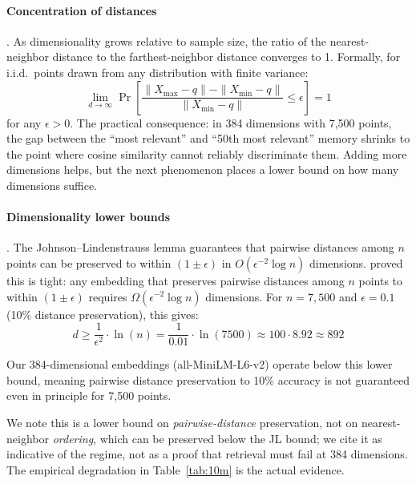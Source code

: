 \documentclass[11pt]{article}
\begin{document}
\paragraph{Concentration of distances} \citep{Beyer1999}.
As dimensionality grows relative to sample size, the ratio of the
nearest-neighbor distance to the farthest-neighbor distance converges
to 1.  Formally, for i.i.d.\ points drawn from any distribution with
finite variance:
\begin{equation}
\lim_{d \to \infty} \Pr\!\left[\frac{\|X_{\max} - q\| - \|X_{\min} - q\|}{\|X_{\min} - q\|} \leq \epsilon\right] = 1
\label{eq:concentration}
\end{equation}
for any $\epsilon > 0$.  The practical consequence: in 384 dimensions
with 7,500 points, the gap between the ``most relevant'' and ``50th
most relevant'' memory shrinks to the point where cosine similarity
cannot reliably discriminate them.  Adding more dimensions helps, but
the next phenomenon places a lower bound on how many dimensions suffice.

\paragraph{Dimensionality lower bounds} \citep{Larsen2017}.
The Johnson--Lindenstrauss lemma guarantees that pairwise distances
among $n$ points can be preserved to within $(1 \pm \epsilon)$ in
$O(\epsilon^{-2} \log n)$ dimensions.  \citet{Larsen2017} proved
this is tight: any embedding that preserves pairwise distances among
$n$ points to within $(1 \pm \epsilon)$ requires
$\Omega(\epsilon^{-2} \log n)$ dimensions.  For $n = 7{,}500$ and
$\epsilon = 0.1$ (10\% distance preservation), this gives:
\begin{equation}
d \geq \frac{1}{\epsilon^2} \cdot \ln(n) = \frac{1}{0.01} \cdot \ln(7500) \approx 100 \cdot 8.92 \approx 892
\label{eq:jl-bound}
\end{equation}

Our 384-dimensional embeddings (all-MiniLM-L6-v2) operate below
this lower bound, meaning pairwise distance preservation to 10\%
accuracy is not guaranteed even in principle for 7,500 points.

We note this is a lower bound on \emph{pairwise-distance} preservation,
not on nearest-neighbor \emph{ordering}, which can be preserved below
the JL bound; we cite it as indicative of the regime, not as a proof
that retrieval must fail at 384 dimensions.  The empirical degradation
in Table~\ref{tab:10m} is the actual evidence.
\end{document}
